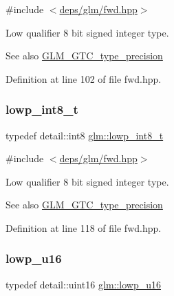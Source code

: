 {\ttfamily \#include $<$\hyperlink{fwd_8hpp}{deps/glm/fwd.\+hpp}$>$}

Low qualifier 8 bit signed integer type. \begin{DoxySeeAlso}{See also}
\hyperlink{group__gtc__type__precision}{G\+L\+M\+\_\+\+G\+T\+C\+\_\+type\+\_\+precision} 
\end{DoxySeeAlso}


Definition at line 102 of file fwd.\+hpp.

\mbox{\label{group__gtc__type__precision_gae6092311f6970a305c2df19a372360a3}} 
\subsubsection{\texorpdfstring{lowp\+\_\+int8\+\_\+t}{lowp\_int8\_t}}
{\footnotesize\ttfamily typedef detail\+::int8 \hyperlink{group__gtc__type__precision_gae6092311f6970a305c2df19a372360a3}{glm\+::lowp\+\_\+int8\+\_\+t}}



{\ttfamily \#include $<$\hyperlink{fwd_8hpp}{deps/glm/fwd.\+hpp}$>$}

Low qualifier 8 bit signed integer type. \begin{DoxySeeAlso}{See also}
\hyperlink{group__gtc__type__precision}{G\+L\+M\+\_\+\+G\+T\+C\+\_\+type\+\_\+precision} 
\end{DoxySeeAlso}


Definition at line 118 of file fwd.\+hpp.

\mbox{\label{group__gtc__type__precision_ga22c5364f27caa0a6eb0627cbc21e46be}} 
\subsubsection{\texorpdfstring{lowp\+\_\+u16}{lowp\_u16}}
{\footnotesize\ttfamily typedef detail\+::uint16 \hyperlink{group__gtc__type__precision_ga22c5364f27caa0a6eb0627cbc21e46be}{glm\+::lowp\+\_\+u16}}



